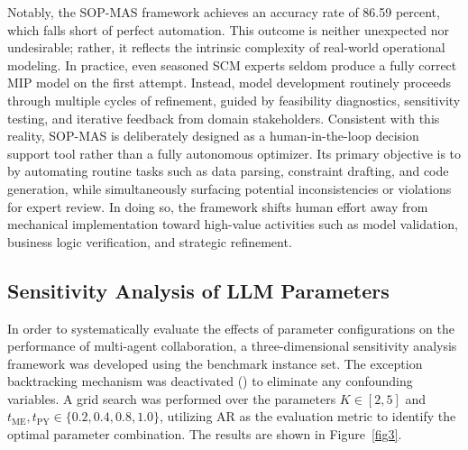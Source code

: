 \documentclass[preprint,12pt]{elsarticle}
\begin{document}
Notably, the SOP-MAS framework achieves an accuracy rate of 86.59 percent, which falls short of perfect automation. This outcome is neither unexpected nor undesirable; rather, it reflects the intrinsic complexity of real-world operational modeling. In practice, even seasoned SCM experts seldom produce a fully correct MIP model on the first attempt. Instead, model development routinely proceeds through multiple cycles of refinement, guided by feasibility diagnostics, sensitivity testing, and iterative feedback from domain stakeholders. Consistent with this reality, SOP-MAS is deliberately designed as a human-in-the-loop decision support tool rather than a fully autonomous optimizer. Its primary objective is to  by automating routine tasks such as data parsing, constraint drafting, and code generation, while simultaneously surfacing potential inconsistencies or violations for expert review.  In doing so, the framework shifts human effort away from mechanical implementation toward high-value activities such as model validation, business logic verification, and strategic refinement.

\subsection{Sensitivity Analysis of LLM Parameters}


In order to systematically evaluate the effects of parameter configurations on the performance of multi-agent collaboration, a three-dimensional sensitivity analysis framework was developed using the benchmark instance set. The exception backtracking mechanism was deactivated () to eliminate any confounding variables. A grid search was performed over the parameters $K \in [2, 5]$ and $t_\text{ME}, t_\text{PY} \in \{0.2, 0.4, 0.8, 1.0\}$, utilizing AR as the evaluation metric to identify the optimal parameter combination. The results are shown in Figure~\ref{fig3}.
\end{document}
